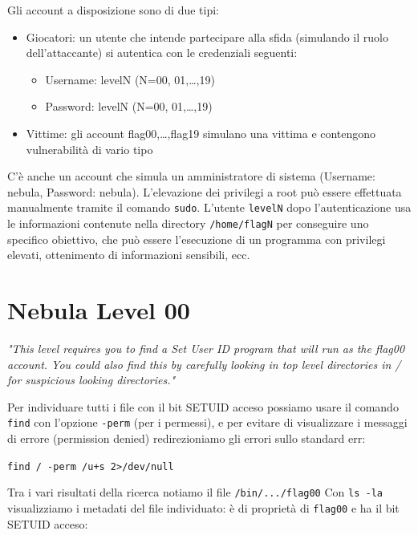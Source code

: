 Gli account a disposizione sono di due tipi:
\begin{itemize}
    \item Giocatori: un utente che intende partecipare alla sfida
(simulando il ruolo dell'attaccante) si autentica
con le credenziali seguenti:
\begin{itemize}
    \item Username: levelN (N=00, 01,…,19)
    \item Password: levelN (N=00, 01,…,19)
\end{itemize}
\item Vittime: gli account flag00,…,flag19 simulano una
vittima e contengono vulnerabilità di vario tipo
\end{itemize}
C'è anche un account che simula un
amministratore di sistema (Username: nebula, Password: nebula). L'elevazione dei privilegi a root può essere
effettuata manualmente tramite il comando \texttt{sudo}. L'utente \texttt{levelN} dopo l'autenticazione usa le informazioni contenute nella directory \texttt{/home/flagN} per conseguire uno specifico obiettivo, che può essere l'esecuzione di un programma con privilegi elevati, ottenimento di informazioni sensibili, ecc.

\section{Nebula Level 00}
\textit{"This level requires you to find a Set User ID
program that will run as the flag00 account.
 You could also find this by carefully
looking in top level directories in / for
suspicious looking directories." }

\vspace{5mm}

Per individuare tutti i file con il bit SETUID acceso possiamo usare il comando \texttt{find} con l'opzione \texttt{-perm} (per i permessi), e per evitare di visualizzare i messaggi di errore (permission denied) redirezioniamo gli errori sullo standard err:
\begin{center}
    \texttt{find / -perm /u+s 2>/dev/null}
\end{center}
Tra i vari risultati della ricerca notiamo il file \texttt{/bin/.../flag00}
Con \texttt{ls -la} visualizziamo i metadati del file individuato: è di proprietà di \texttt{flag00} e ha il bit SETUID acceso:

